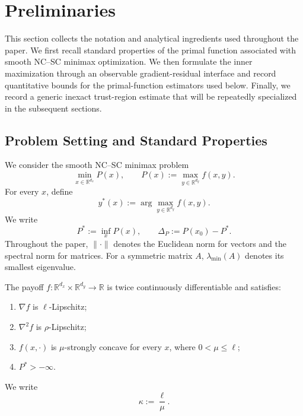 \section{Preliminaries}
\label{sec:preliminaries}

This section collects the notation and analytical ingredients used
throughout the paper. We first recall standard properties of the
primal function associated with smooth NC--SC minimax optimization.
We then formulate the inner maximization through an observable
gradient-residual interface and record quantitative bounds for the
primal-function estimators used below. Finally, we record a generic inexact trust-region estimate
that will be repeatedly specialized in the subsequent sections.


\subsection{Problem Setting and Standard Properties}
\label{sec:problem-setting}

We consider the smooth NC--SC minimax problem
\begin{equation}
    \min_{x\in\mathbb{R}^{d_x}} P(x),
    \qquad
    P(x):=\max_{y\in\mathbb{R}^{d_y}} f(x,y).
    \label{eq:ncsc-problem}
\end{equation}
For every $x$, define
\begin{equation}
    y^*(x):=\arg\max_{y\in\mathbb{R}^{d_y}} f(x,y).
    \label{eq:inner-maximizer}
\end{equation}
We write
\[
    P^*:=\inf_x P(x),
    \qquad
    \Delta_P:=P(x_0)-P^*.
\]
Throughout the paper, $\|\cdot\|$ denotes the Euclidean norm for
vectors and the spectral norm for matrices. For a symmetric matrix
$A$, $\lambda_{\min}(A)$ denotes its smallest eigenvalue.

\begin{assumption}[NC--SC regularity]
\label{ass:ncsc}
The payoff
$f:\mathbb{R}^{d_x}\times\mathbb{R}^{d_y}\to\mathbb{R}$
is twice continuously differentiable and satisfies:
\begin{enumerate}[label=(\roman*)]
    \item $\nabla f$ is $\ell$-Lipschitz;
    \item $\nabla^2 f$ is $\rho$-Lipschitz;
    \item $f(x,\cdot)$ is $\mu$-strongly concave for every $x$,
          where $0<\mu\le\ell$;
    \item $P^*>-\infty$.
\end{enumerate}
We write
\begin{equation}
    \kappa:=\frac{\ell}{\mu}.
    \label{eq:kappa}
\end{equation}
\end{assumption}

